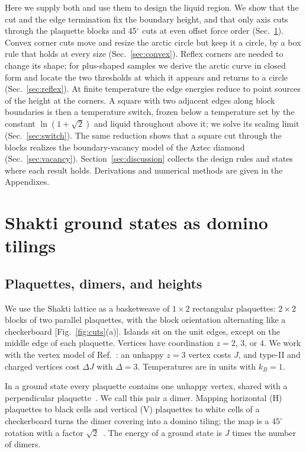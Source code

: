 \documentclass[reprint,aps,prb,floatfix,longbibliography,amsmath,amssymb]{revtex4-2}
\newcommand{\lnt}{\ln(1+\sqrt2)}
\begin{document}
Here we supply both and use them to design the liquid region. We show that the cut and the edge termination fix the boundary height, and that only axis cuts through the plaquette blocks and 45$^\circ$ cuts at even offset force order (Sec.~\ref{sec:model}). Convex corner cuts move and resize the arctic circle but keep it a circle, by a box rule that holds at every size (Sec.~\ref{sec:convex}). Reflex corners are needed to change its shape; for plus-shaped samples we derive the arctic curve in closed form and locate the two thresholds at which it appears and returns to a circle (Sec.~\ref{sec:reflex}). At finite temperature the edge energies reduce to point sources of the height at the corners. A square with two adjacent edges along block boundaries is then a temperature switch, frozen below a temperature set by the constant $\lnt$ and liquid throughout above it; we solve its scaling limit (Sec.~\ref{sec:switch}). The same reduction shows that a square cut through the blocks realizes the boundary-vacancy model of the Aztec diamond~\cite{WonVacancies} (Sec.~\ref{sec:vacancy}). Section~\ref{sec:discussion} collects the design rules and states where each result holds. Derivations and numerical methods are given in the Appendixes.

\section{Shakti ground states as domino tilings}\label{sec:model}

\subsection{Plaquettes, dimers, and heights}

We use the Shakti lattice as a basketweave of $1\times2$ rectangular plaquettes: $2\times2$ blocks of two parallel plaquettes, with the block orientation alternating like a checkerboard [Fig.~\ref{fig:cuts}(a)]. Islands sit on the unit edges, except on the middle edge of each plaquette. Vertices have coordination $z=2$, 3, or 4. We work with the vertex model of Ref.~\cite{KimVorticity}: an unhappy $z=3$ vertex costs $J$, and type-II and charged vertices cost $\Delta J$ with $\Delta=3$. Temperatures are in units with $k_B=1$.

In a ground state every plaquette contains one unhappy vertex, shared with a perpendicular plaquette~\cite{Morrison2013,Chern2013,Lao2018}. We call this pair a dimer. Mapping horizontal (H) plaquettes to black cells and vertical (V) plaquettes to white cells of a checkerboard turns the dimer covering into a domino tiling; the map is a $45^\circ$ rotation with a factor $\sqrt2$~\cite{KimVorticity}. The energy of a ground state is $J$ times the number of dimers.
\end{document}

